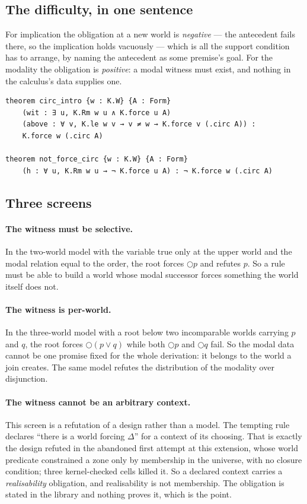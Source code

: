 \documentclass[11pt,a4paper]{article}
\begin{document}
\subsection{The difficulty, in one sentence}

For implication the obligation at a new world is \emph{negative} --- the
antecedent fails there, so the implication holds vacuously --- which is
all the support condition has to arrange, by naming the antecedent as some
premise's goal. For the modality the obligation is \emph{positive}: a
modal witness must exist, and nothing in the calculus's data supplies one.

\begin{lstlisting}
theorem circ_intro {w : K.W} {A : Form}
    (wit : ∃ u, K.Rm w u ∧ K.force u A)
    (above : ∀ v, K.le w v → v ≠ w → K.force v (.circ A)) :
    K.force w (.circ A)

theorem not_force_circ {w : K.W} {A : Form}
    (h : ∀ u, K.Rm w u → ¬ K.force u A) : ¬ K.force w (.circ A)
\end{lstlisting}

\subsection{Three screens}

\paragraph{The witness must be selective.} In the two-world model with the
variable true only at the upper world and the modal relation equal to the
order, the root forces $\bigcirc p$ and refutes $p$. So a rule must be able
to build a world whose modal successor forces something the world itself
does not.

\paragraph{The witness is per-world.} In the three-world model with a root
below two incomparable worlds carrying $p$ and $q$, the root forces
$\bigcirc(p \lor q)$ while both $\bigcirc p$ and $\bigcirc q$ fail. So the
modal data cannot be one promise fixed for the whole derivation: it
belongs to the world a join creates. The same model refutes the
distribution of the modality over disjunction.

\paragraph{The witness cannot be an arbitrary context.} This screen is a
refutation of a design rather than a model. The tempting rule declares
``there is a world forcing $\Delta$'' for a context of its choosing. That
is exactly the design refuted in the abandoned first attempt at this
extension, whose world predicate constrained a zone only by membership in
the universe, with no closure condition; three kernel-checked cells killed
it. So a declared context carries a \emph{realisability} obligation, and
realisability is not membership. The obligation is stated in the library
and nothing proves it, which is the point.
\end{document}
